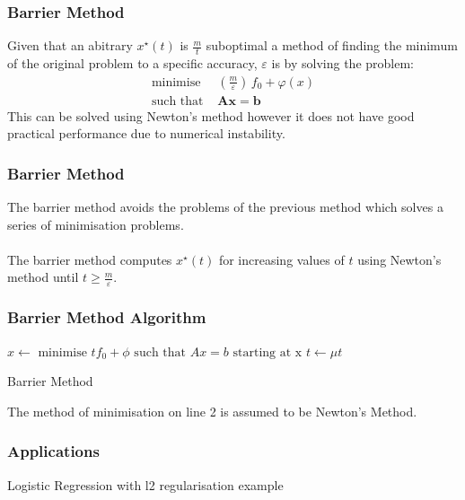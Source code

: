 \documentclass{beamer}
\begin{document}
\begin{frame}
    \frametitle{Barrier Method}
    Given that an abitrary $x^{\star}(t)$ is $\frac{m}{t}$ suboptimal a method of
    finding the minimum of the original problem to a specific accuracy,
    $\varepsilon$ is by solving the problem:
    \begin{align*}
        \text{minimise } \, &\left(\frac{m}{\varepsilon}\right)\,f_{0} +
        \varphi(x)\\
        \text{such that } & \mathbf{A}\mathbf{x} =\mathbf{b}
    \end{align*}
    This can be solved using Newton's method however it does not have good
    practical performance due to numerical instability.
\end{frame}

\begin{frame}
    \frametitle{Barrier Method}
    The barrier method avoids the problems of the previous method which solves a
    series of minimisation problems.
    \\~\\
    The barrier method computes $x^{\star}(t)$ for increasing values of
    $t$ using Newton's method until $t \geq \frac{m}{\varepsilon}$.
\end{frame}

\begin{frame}
    \frametitle{Barrier Method Algorithm}
    \begin{algorithm}[H]
        \begin{algorithmic}[1]
            \STATE $x \leftarrow \text{ minimise } tf_{0} + \phi
            \text{ such that } Ax = b \text{ starting at x}$
            \STATE $t \leftarrow \mu t$
            \ENDWHILE
        \end{algorithmic}
        \caption{Barrier Method}
        \label{alg:seq}
    \end{algorithm}
    The method of minimisation on line 2 is assumed to be Newton's Method.
\end{frame}

\begin{frame}
    \frametitle{Applications}
    Logistic Regression with l2 regularisation example
\end{frame}



\end{document}
